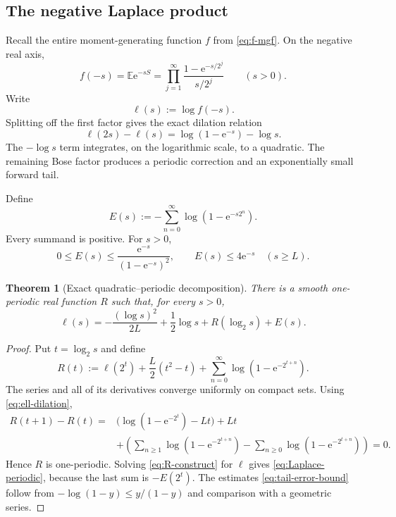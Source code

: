 \documentclass[11pt]{article}
\numberwithin{equation}{section}
\newtheorem{theorem}{Theorem}[section]
\theoremstyle{definition}
\theoremstyle{remark}
\newcommand{\e}{\mathrm e}
\begin{document}
\subsection{The negative Laplace product}

Recall the entire moment-generating function $f$ from \eqref{eq:f-mgf}.  On
the negative real axis,
\begin{equation}\label{eq:negative-Laplace-product}
 f(-s)=\mathbb E\e^{-sS}
 =\prod_{j=1}^{\infty}
   \frac{1-\e^{-s/2^j}}{s/2^j}
 \qquad(s>0).
\end{equation}
Write
\begin{equation}\label{eq:ell-def}
 \ell(s):=\log f(-s).
\end{equation}
Splitting off the first factor gives the exact dilation relation
\begin{equation}\label{eq:ell-dilation}
 \ell(2s)-\ell(s)=\log(1-\e^{-s})-\log s.
\end{equation}
The $-\log s$ term integrates, on the logarithmic scale, to a quadratic.  The
remaining Bose factor produces a periodic correction and an exponentially
small forward tail.

Define
\begin{equation}\label{eq:forward-tail-error}
 E(s):=-\sum_{n=0}^{\infty}\log(1-\e^{-s2^n}).
\end{equation}
Every summand is positive.  For $s>0$,
\begin{equation}\label{eq:tail-error-bound}
 0\le E(s)\le
 \frac{\e^{-s}}{(1-\e^{-s})^2},
 \qquad
 E(s)\le4\e^{-s}\quad(s\ge L).
\end{equation}

\begin{theorem}[Exact quadratic--periodic decomposition]\label{thm:Laplace-periodic}
There is a smooth one-periodic real function $R$ such that, for every $s>0$,
\begin{equation}\label{eq:Laplace-periodic}
\boxed{
 \ell(s)=-\frac{(\log s)^2}{2L}+\frac12\log s
       +R(\log_2s)+E(s).}
\end{equation}
\end{theorem}

\begin{proof}
Put $t=\log_2s$ and define
\begin{equation}\label{eq:R-construct}
 R(t):=\ell(2^t)+\frac L2(t^2-t)
       +\sum_{n=0}^{\infty}\log(1-\e^{-2^{t+n}}).
\end{equation}
The series and all of its derivatives converge uniformly on compact sets.
Using \eqref{eq:ell-dilation},
\begin{align*}
 R(t+1)-R(t)
 ={}&\bigl(\log(1-\e^{-2^t})-Lt\bigr)+Lt\\
 &+\left(\sum_{n\ge1}\log(1-\e^{-2^{t+n}})
       -\sum_{n\ge0}\log(1-\e^{-2^{t+n}})\right)=0.
\end{align*}
Hence $R$ is one-periodic.  Solving \eqref{eq:R-construct} for $\ell$ gives
\eqref{eq:Laplace-periodic}, because the last sum is $-E(2^t)$.
The estimates \eqref{eq:tail-error-bound} follow from
$-\log(1-y)\le y/(1-y)$ and comparison with a geometric series.
\end{proof}
\end{document}
